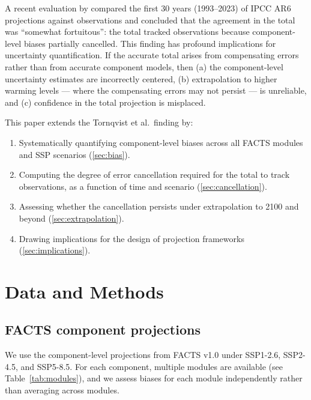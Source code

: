 \documentclass[11pt]{article}
\begin{document}
A recent evaluation by \citet{tornqvist2025evaluating} compared the first 30 years (1993--2023) of IPCC AR6 projections against observations and concluded that the agreement in the total was ``somewhat fortuitous'': the total tracked observations because component-level biases partially cancelled.  This finding has profound implications for uncertainty quantification.  If the accurate total arises from compensating errors rather than from accurate component models, then (a) the component-level uncertainty estimates are incorrectly centered, (b) extrapolation to higher warming levels --- where the compensating errors may not persist --- is unreliable, and (c) confidence in the total projection is misplaced.

This paper extends the Tornqvist et al.\ finding by:
\begin{enumerate}
  \item Systematically quantifying component-level biases across all FACTS modules and SSP scenarios (\cref{sec:bias}).
  \item Computing the degree of error cancellation required for the total to track observations, as a function of time and scenario (\cref{sec:cancellation}).
  \item Assessing whether the cancellation persists under extrapolation to 2100 and beyond (\cref{sec:extrapolation}).
  \item Drawing implications for the design of projection frameworks (\cref{sec:implications}).
\end{enumerate}


\section{Data and Methods}
\label{sec:data}

\subsection{FACTS component projections}

We use the component-level projections from FACTS v1.0 \citep{kopp2023facts} under SSP1-2.6, SSP2-4.5, and SSP5-8.5.  For each component, multiple modules are available (see Table~\ref{tab:modules}), and we assess biases for each module independently rather than averaging across modules.
\end{document}
